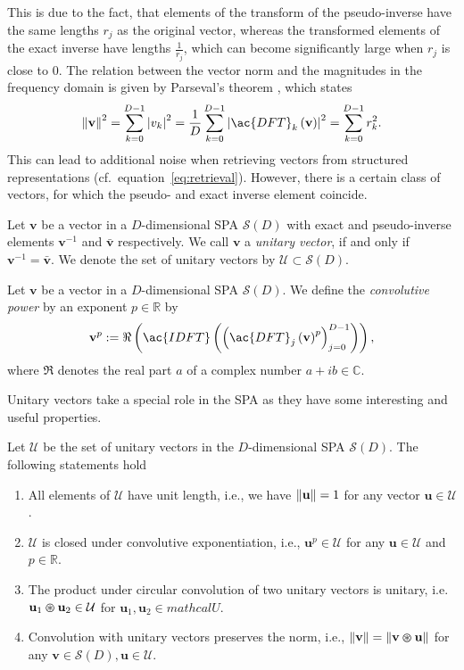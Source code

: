 This is due to the fact, that elements of the transform of the pseudo-inverse have the same lengths $r_j$ as the original vector, whereas the transformed elements of the exact inverse have lengths $\frac{1}{r_j}$, which can become significantly large when $r_j$ is close to $0$.
The relation between the vector norm and the magnitudes in the frequency domain is given by Parseval's theorem  \parencite[also known as Rayleigh's theorem, see][Chap. 6]{Bracewell2000}, which states
\begin{equation}
\label{eq:parseval}
\norm{\mathbf{v}}^2 = \sum_{k=0}^{D-1} \left| v_{k} \right|^{2} = \frac{1}{D} \sum_{k=0}^{D-1} \left|\ac{DFT}_{k}\left( \mathbf{v}\right)\right|^{2} = \sum_{k=0}^{D-1} r_{k}^{2}.
\end{equation}
This can lead to additional noise when retrieving vectors from structured representations (cf.\ equation~\eqref{eq:retrieval}).
However, there is a certain class of vectors, for which the pseudo- and exact inverse element coincide.
\begin{defn}
	\label{def:unitary_vec}
	Let $ \mathbf{v}$ be a vector in a $D$-dimensional \ac{SPA} $\mathcal{S}(D)$ with exact and pseudo-inverse elements $ \mathbf{v}^{-1}$ and $\bar{\mathbf{v}}$ respectively.
	We call $ \mathbf{v}$ a \emph{unitary vector}, if and only if $ \mathbf{v}^{-1} = \bar{\mathbf{v}}$.
	We denote the set of unitary vectors by $\mathcal{U} \subset \mathcal{S}(D)$.
\end{defn}
\begin{defn}
	\label{def:conv_power}
	Let $ \mathbf{v}$ be a vector in a $D$-dimensional \ac{SPA} $\mathcal{S}(D)$. We define the \emph{convolutive power} by an exponent $p \in \mathbb{R}$ by
	\[
	\mathbf{v}^{p} := \Re\left(\ac{IDFT} \left(\left(\ac{DFT}_{j}\left( \mathbf{v}\right)^{p}\right)_{j=0}^{D-1}\right)\right),
	\]
	where $\Re$ denotes the real part $a$ of a complex number $a + ib \in \mathbb{C}$.
\end{defn}
Unitary vectors take a special role in the \ac{SPA} as they have some interesting and useful properties.
\begin{lemma}
	\label{lemma:unitary_vec}
	Let $\mathcal{U}$ be the set of unitary vectors in the $D$-dimensional \ac{SPA} $\mathcal{S}(D)$.
    The following statements hold
 	\begin{enumerate}[label=\roman*]
		\item All elements of $\mathcal{U}$ have unit length, i.e., we have $\left\| \mathbf{u} \right\| = 1$ for any vector $ \mathbf{u} \in \mathcal{U}$.
		\item $\mathcal{U}$ is closed under convolutive exponentiation, i.e., $ \mathbf{u}^{p} \in \mathcal{U}$ for any $ \mathbf{u} \in \mathcal{U}$ and $p \in \mathbb{R}$.
        \item The product under circular convolution of two unitary vectors is unitary, i.e.\ $ \mathbf{u}_{1} \varoast \mathbf{u}_{2} \in \mathcal{U} $ for $ \mathbf{u}_{1}, \mathbf{u}_{2} \in mathcal{U}.$
		\item Convolution with unitary vectors preserves the norm, i.e., $\left\| \mathbf{v} \right\| = \left\|  \mathbf{v} \varoast \mathbf{u} \right\|$ for any $ \mathbf{v} \in \mathcal{S}(D), \mathbf{u} \in \mathcal{U}$.
	\end{enumerate}
\end{lemma}
